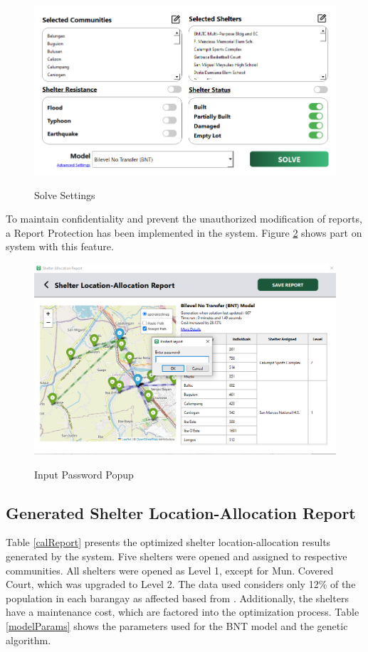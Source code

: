 \documentclass[11pt,letterpaper,]{article}
\begin{document}
	\begin{figure}[h!]
		\caption{Solve Settings}
		\centering
		\includegraphics[width=0.6\columnwidth]{Chapter 4/solvesettings}
		\label{solveSet}
	\end{figure}
	
	To maintain confidentiality and prevent the unauthorized modification of reports, a Report Protection has been implemented in the system. Figure \ref{passPop} shows part on system with this feature.
	
	\begin{figure}[h!]
		\caption{Input Password Popup}
		\centering
		\includegraphics[width=0.6\columnwidth]{Chapter 4/alloc report pass}
		\label{passPop}
	\end{figure}
	
	
	\subsection{Generated Shelter Location-Allocation Report}
	 Table \ref{calReport} presents the optimized shelter location-allocation results generated by the system. Five shelters were opened and assigned to respective communities. All shelters were opened as Level 1, except for Mun. Covered Court, which was upgraded to Level 2. The data used considers only 12\% of the population in each barangay as affected based from \textcite{Opdyke2024}. Additionally, the shelters have a maintenance cost, which are factored into the optimization process. Table \ref{modelParams} shows the parameters used for the BNT model and the genetic algorithm.
	
\end{document}
